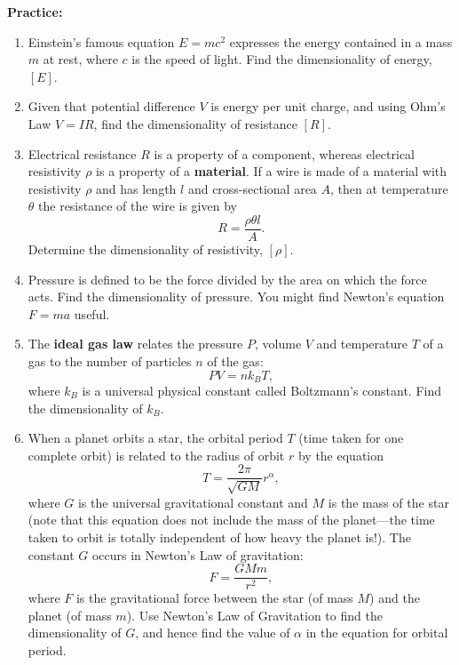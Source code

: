 \documentclass{article}
\begin{document}
\textbf{Practice:}\bigskip


\begin{enumerate}
	\item Einstein's famous equation $E=mc^2$ expresses the energy contained in a mass $m$ at rest, where $c$ is the speed of light. Find the dimensionality of energy, $[E]$.
	\item Given that potential difference $V$ is energy per unit charge, and using Ohm's Law $V=IR$, find the dimensionality of resistance $[R]$.
	\item Electrical resistance $R$ is a property of a component, whereas electrical resistivity $\rho$ is a property of a \textbf{material}. If a wire is made of a material with resistivity $\rho$ and has length $l$ and cross-sectional area $A$, then at temperature $\theta$ the resistance of the wire is given by
		\[R=\frac{\rho\theta l}{A}.\]
		Determine the dimensionality of resistivity, $[\rho]$.
	\item Pressure is defined to be the force divided by the area on which the force acts. Find the dimensionality of pressure. You might find Newton's equation $F=ma$ useful.
	\item The \textbf{ideal gas law} relates the pressure $P$, volume $V$ and temperature $T$ of a gas to the number of particles $n$ of the gas:
		\[PV=nk_BT,\]
		where $k_B$ is a universal physical constant called Boltzmann's constant. Find the dimensionality of $k_B$.
	\item When a planet orbits a star, the orbital period $T$ (time taken for one complete orbit) is related to the radius of orbit $r$ by the equation
		\[T=\frac{2\pi}{\sqrt{GM}}r^\alpha,\]
		where $G$ is the universal gravitational constant and $M$ is the mass of the star (note that this equation does not include the mass of the planet---the time taken to orbit is totally independent of how heavy the planet is!). The constant $G$ occurs in Newton's Law of gravitation:
		\[F=\frac{GMm}{r^2},\]
		where $F$ is the gravitational force between the star (of mass $M$) and the planet (of mass $m$).
		Use Newton's Law of Gravitation to find the dimensionality of $G$, and hence find the value of $\alpha$ in the equation for orbital period.
\end{enumerate}
\end{document}
